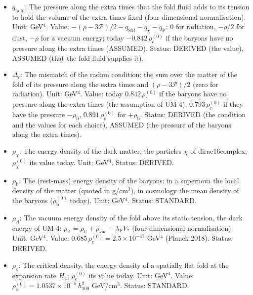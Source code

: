 \documentclass[
  10pt,
]{article}
\providecommand{\tightlist}{%
  \setlength{\itemsep}{0pt}\setlength{\parskip}{0pt}}
\begin{document}
\begin{itemize}
\tightlist
\item
  \(q_{\mathrm{hold}}\): The pressure along the extra times that the
  fold fluid adds to its tension to hold the volume of the extra times
  fixed (four-dimensional normalisation). Unit: GeV\(^4\). Value:
  \(-(\rho - 3\mathcal{P})/2 - q_{\mathrm{SM}} - q_\chi - q_{\mathrm{P}}\):
  0 for radiation, \(-\rho/2\) for dust, \(-\rho\) for a vacuum energy;
  today \(-0.842\,\rho_{\mathrm{c}}^{(0)}\) if the baryons have no
  pressure along the extra times (ASSUMED). Status: DERIVED (the value),
  ASSUMED (that the fold fluid supplies it).
\item
  \(\Delta_{\mathrm{r}}\): The mismatch of the radion condition: the sum
  over the matter of the fold of its pressure along the extra times and
  \((\rho - 3\mathcal{P})/2\) (zero for radiation). Unit: GeV\(^4\).
  Value: today \(0.842\,\rho_{\mathrm{c}}^{(0)}\) if the baryons have no
  pressure along the extra times (the assumption of UM-4),
  \(0.793\,\rho_{\mathrm{c}}^{(0)}\) if they have the pressure
  \(-\rho_{\mathrm{b}}\), \(0.891\,\rho_{\mathrm{c}}^{(0)}\) for
  \(+\rho_{\mathrm{b}}\). Status: DERIVED (the condition and the values
  for each choice), ASSUMED (the pressure of the baryons along the extra
  times).
\item
  \(\rho_\chi\): The energy density of the dark matter, the particles
  \(\chi\) of dirac16complex; \(\rho_\chi^{(0)}\) its value today. Unit:
  GeV\(^4\). Status: DERIVED.
\item
  \(\rho_{\mathrm{b}}\): The (rest-mass) energy density of the baryons:
  in a supernova the local density of the matter (quoted in g/cm\(^3\)),
  in cosmology the mean density of the baryons
  (\(\rho_{\mathrm{b}}^{(0)}\) today). Unit: GeV\(^4\). Status:
  STANDARD.
\item
  \(\rho_\Lambda\): The vacuum energy density of the fold above its
  static tension, the dark energy of UM-4:
  \(\rho_\Lambda = \rho_{\mathrm{ff}} + \rho_{\mathrm{vac}} - \lambda_{\mathrm{F}}V_*\)
  (four-dimensional normalisation). Unit: GeV\(^4\). Value:
  \(0.685\,\rho_{\mathrm{c}}^{(0)} = 2.5\times10^{-47}\) GeV\(^4\)
  (Planck 2018). Status: DERIVED.
\item
  \(\rho_{\mathrm{c}}\): The critical density, the energy density of a
  spatially flat fold at the expansion rate \(H_4\);
  \(\rho_{\mathrm{c}}^{(0)}\) its value today. Unit: GeV\(^4\). Value:
  \(\rho_{\mathrm{c}}^{(0)} = 1.0537\times10^{-5}\,h_{100}^2\)
  GeV/cm\(^3\). Status: STANDARD.
\end{itemize}
\end{document}

